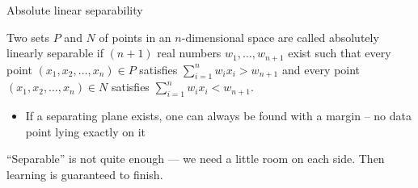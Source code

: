 \documentclass[aspectratio=169, 11pt]{beamer}
\newcommand{\src}[3]{}      %
\begin{document}
\begin{frame}{Absolute linear separability}
  \src{rojas1996}{section}{4.1.3}
  \begin{redhighlight}
   Two sets $P$ and $N$ of points in an $n$-dimensional space are
called absolutely linearly separable if $(n + 1)$ real numbers $w_1,\ldots, w_{n+1}$ exist such that every point $(x_1, x_2,\ldots , x_n)\in  P$ satisfies $\sum\limits_{i=1}^n w_ix_i > w_{n+1}$ and  every point $(x_1, x_2,\ldots , x_n)\in  N$  satisfies $\sum\limits_{i=1}^n w_ix_i < w_{n+1}$.
  \end{redhighlight}
  \begin{itemize}\setlength{\itemsep}{2pt}
    \item If a separating plane exists, one can always be
          found with a \alert{margin} -- no data point lying
          exactly on it
  \end{itemize}
  \vspace{0.3em}
  \begin{redhighlight}
    ``Separable'' is not quite enough --- we need a little room
    on each side. Then learning is guaranteed to finish.
  \end{redhighlight}
\end{frame}

\end{document}
